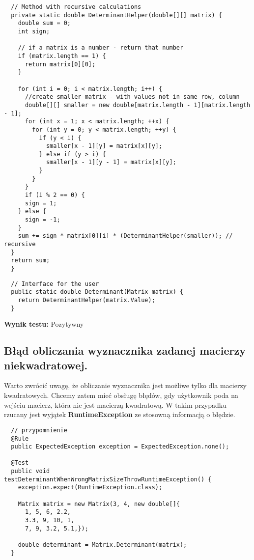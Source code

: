 \documentclass[a4paper,12pt,twoside]{article}
\begin{document}
\begin{lstlisting}
  // Method with recursive calculations
  private static double DeterminantHelper(double[][] matrix) {
    double sum = 0;
    int sign;

    // if a matrix is a number - return that number
    if (matrix.length == 1) {
      return matrix[0][0];
    }

    for (int i = 0; i < matrix.length; i++) {
      //create smaller matrix - with values not in same row, column
      double[][] smaller = new double[matrix.length - 1][matrix.length - 1];
      for (int x = 1; x < matrix.length; ++x) {
        for (int y = 0; y < matrix.length; ++y) {
          if (y < i) {
            smaller[x - 1][y] = matrix[x][y];
          } else if (y > i) {
            smaller[x - 1][y - 1] = matrix[x][y];
          }
        }
      }
      if (i % 2 == 0) {
      sign = 1;
    } else {
      sign = -1;
    }
    sum += sign * matrix[0][i] * (DeterminantHelper(smaller)); // recursive
  }
  return sum;
  }
\end{lstlisting}

\begin{lstlisting}
  // Interface for the user
  public static double Determinant(Matrix matrix) {
    return DeterminantHelper(matrix.Value);
  }
\end{lstlisting}
\medskip

\noindent
\textbf{Wynik testu: }{\color{green} Pozytywny}


\subsection{Błąd obliczania wyznacznika zadanej macierzy niekwadratowej.}
\bigskip

Warto zwrócić uwagę, że obliczanie wyznacznika jest możliwe tylko dla macierzy kwadratowych.
Chcemy zatem mieć obsługę błędów, gdy użytkownik poda na wejściu macierz, która nie
jest macierzą kwadratową. W takim przypadku rzucany jest wyjątek \textbf{RuntimeException}
ze stosowną informacją o błędzie.\\

\begin{lstlisting}
  // przypomnienie
  @Rule
  public ExpectedException exception = ExpectedException.none();

  @Test
  public void testDeterminantWhenWrongMatrixSizeThrowRuntimeException() {
    exception.expect(RuntimeException.class);

    Matrix matrix = new Matrix(3, 4, new double[]{
      1, 5, 6, 2.2,
      3.3, 9, 10, 1,
      7, 9, 3.2, 5.1,});

    double determinant = Matrix.Determinant(matrix);
  }
\end{lstlisting}
\medskip
\end{document}
